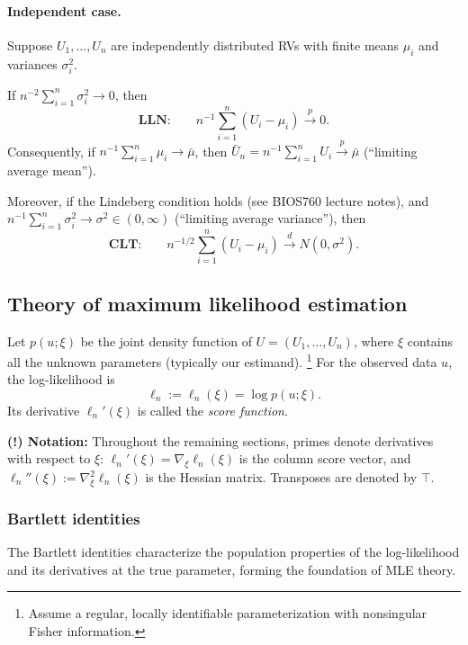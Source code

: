 \documentclass{article}
\theoremstyle{break}
\begin{document}
\paragraph{Independent case.} Suppose $U_1, \ldots, U_n$ are independently distributed RVs with finite means $\mu_i$ and variances $\sigma_i^2$. 

If $n^{-2} \sum_{i=1}^n\sigma_i^2 \to 0$, then
\[
    \textbf{LLN:}\qquad
    n^{-1}\sum_{i=1}^n(U_i-\mu_i)\stackrel{p}{\to}0.
\]
Consequently, if $n^{-1}\sum_{i=1}^n\mu_i\to\bar\mu$, then
$\bar U_n=n^{-1}\sum_{i=1}^nU_i\stackrel{p}{\to}\bar\mu$ (``limiting average mean'').

Moreover, if the Lindeberg condition holds (see BIOS760 lecture notes), and $n^{-1}\sum_{i=1}^n\sigma_i^2 \to \sigma^2 \in (0,\infty)$ (``limiting average variance''), then
\[
    \textbf{CLT:}\qquad
    n^{-1/2}\sum_{i=1}^n(U_i-\mu_i)
    \stackrel{d}{\to}N(0,\sigma^2).
\]



\subsection{Theory of maximum likelihood estimation}\label{sec:prelim-glm-mle-theory}
Let $p(u; \xi)$ be the joint density function of $U = (U_1, \ldots, U_n)$, where $\xi$ contains all the unknown parameters (typically our estimand).
\footnote{Assume a regular, locally identifiable parameterization with nonsingular Fisher information.}
For the observed data $u$, the log-likelihood is
\[
\ell_n := \ell_n(\xi) = \log p(u; \xi).
\]
Its derivative $\ell_n'(\xi)$ is called the \emph{score function}. 

\textbf{(!) Notation:} Throughout the remaining sections, primes denote derivatives with respect to $\xi$: $\ell_n'(\xi)=\nabla_\xi\ell_n(\xi)$ is the column score vector, and $\ell_n''(\xi):=\nabla_\xi^2\ell_n(\xi)$ is the Hessian matrix. Transposes are denoted by $\top$.


\subsubsection{Bartlett identities}
The Bartlett identities characterize the population properties of the log-likelihood and its derivatives at the true parameter, forming the foundation of MLE theory.
\end{document}

